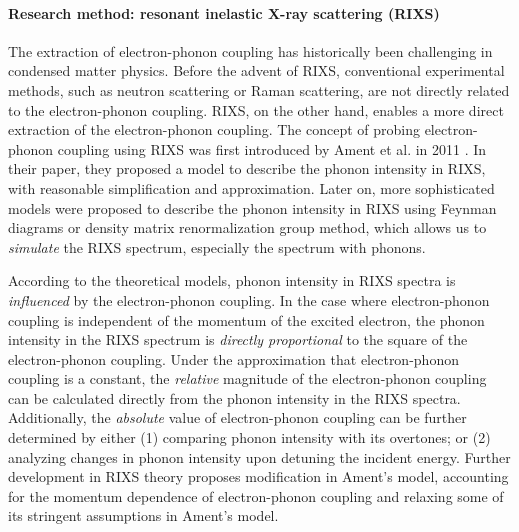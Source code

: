 \documentclass[11pt]{article}
\begin{document}
\paragraph{Research method: resonant inelastic X-ray scattering (RIXS)}
The extraction of electron-phonon coupling has historically been challenging in condensed matter physics. Before the advent of RIXS, conventional experimental methods, such as neutron scattering or Raman scattering, are not directly related to the electron-phonon coupling. RIXS, on the other hand, enables a more direct extraction of the electron-phonon coupling. The concept of probing electron-phonon coupling using RIXS was first introduced by Ament et al. in 2011 \cite{ament_resonant_2011}. In their paper, they proposed a model to describe the phonon intensity in RIXS, with reasonable simplification and approximation. Later on, more sophisticated models were proposed to describe the phonon intensity in RIXS using Feynman diagrams \cite{devereaux_directly_2016,matsubayashi_numerical_2023} or density matrix renormalization group method\cite{nocera_computing_2018}, which allows us to \textit{simulate}  the RIXS spectrum, especially the spectrum with phonons. 

According to the theoretical models, phonon intensity in RIXS spectra is \textit{influenced} by the electron-phonon coupling\cite{devereaux_directly_2016}. In the case where electron-phonon coupling is independent of the momentum of the excited electron, the phonon intensity in the RIXS spectrum is \textit{directly proportional}  to the square of the electron-phonon coupling. Under the approximation that electron-phonon coupling is a constant, the \textit{relative} magnitude of the electron-phonon coupling can be calculated directly from the phonon intensity in the RIXS spectra. Additionally, the \textit{absolute} value of electron-phonon coupling can be further determined by either (1) comparing phonon intensity with its overtones; or (2) analyzing changes in phonon intensity upon detuning the incident energy\cite{ament_resonant_2011,braicovich_determining_2020}. Further development in RIXS theory proposes modification in Ament's model, accounting for the momentum dependence of electron-phonon coupling and relaxing some of its stringent assumptions in Ament's model\cite{bieniasz_theory_2022,geondzhian_generalization_2020}. 
\end{document}
